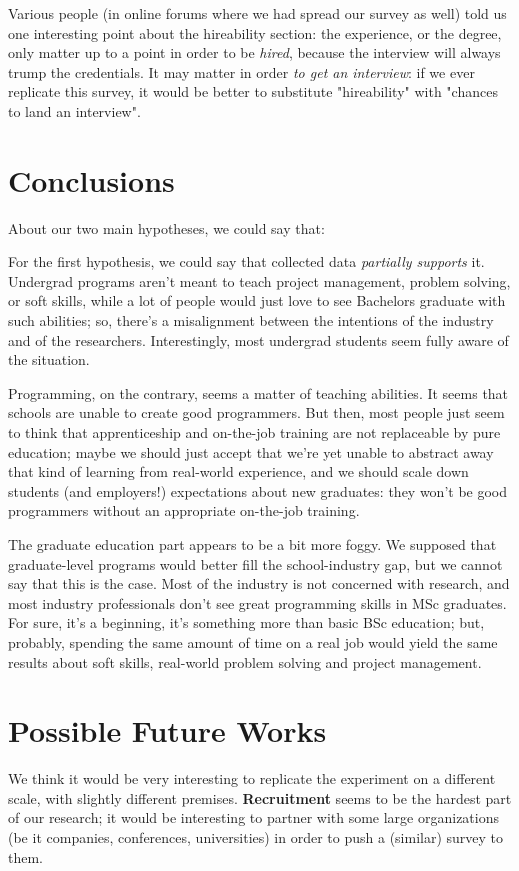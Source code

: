 \documentclass{sigchi}
\begin{document}
Various people (in online forums where we had spread our survey as well) told us one interesting point about the hireability section: the experience, or the degree, only matter up to a point in order to be \textit{hired}, because the interview will always trump the credentials. It may matter in order \textit{to get an interview}: if we ever replicate this survey, it would be better to substitute "hireability" with "chances to land an interview".

\section{Conclusions}
About our two main hypotheses, we could say that:

For the first hypothesis, we could say that collected data \textit{partially supports} it. Undergrad programs aren't meant to teach project management, problem solving, or soft skills, while a lot of people would just love to see Bachelors graduate with such abilities; so, there's a misalignment between the intentions of the industry and of the researchers. Interestingly, most undergrad students seem fully aware of the situation.

Programming, on the contrary, seems a matter of teaching abilities. It seems that schools are unable to create good programmers. But then, most people just seem to think that apprenticeship and on-the-job training are not replaceable by pure education; maybe we should just accept that we're yet unable to abstract away that kind of learning from real-world experience, and we should scale down students (and employers!) expectations about new graduates: they won't be good programmers without an appropriate on-the-job training.

The graduate education part appears to be a bit more foggy. We supposed that graduate-level programs would better fill the school-industry gap, but we cannot say that this is the case. Most of the industry is not concerned with research, and most industry professionals don't see great programming skills in MSc graduates. For sure, it's a beginning, it's something more than basic BSc education; but, probably, spending the same amount of time on a real job would yield the same results about soft skills, real-world problem solving and project management.

\section{Possible Future Works}
We think it would be very interesting to replicate the experiment on a different scale, with slightly different premises. \textbf{Recruitment} seems to be the hardest part of our research; it would be interesting to partner with some large organizations (be it companies, conferences, universities) in order to push a (similar) survey to them.
\end{document}
